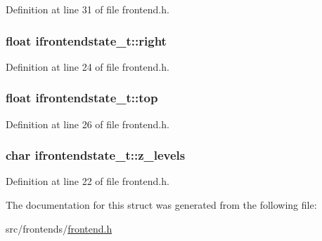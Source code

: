 Definition at line 31 of file frontend.\-h.

\hypertarget{structifrontendstate__t_a7c304035e472522fb01b3bb85b37eef8}{
\subsubsection[{right}]{\setlength{\rightskip}{0pt plus 5cm}float ifrontendstate\-\_\-t\-::right}}\label{structifrontendstate__t_a7c304035e472522fb01b3bb85b37eef8}


Definition at line 24 of file frontend.\-h.

\hypertarget{structifrontendstate__t_afda9cb91a47174c6e95a4888918964f4}{
\subsubsection[{top}]{\setlength{\rightskip}{0pt plus 5cm}float ifrontendstate\-\_\-t\-::top}}\label{structifrontendstate__t_afda9cb91a47174c6e95a4888918964f4}


Definition at line 26 of file frontend.\-h.

\hypertarget{structifrontendstate__t_aefb96a4cd8758bcd9a3e5b506290adca}{
\subsubsection[{z\-\_\-levels}]{\setlength{\rightskip}{0pt plus 5cm}char ifrontendstate\-\_\-t\-::z\-\_\-levels}}\label{structifrontendstate__t_aefb96a4cd8758bcd9a3e5b506290adca}


Definition at line 22 of file frontend.\-h.



The documentation for this struct was generated from the following file\-:\begin{DoxyCompactItemize}
\item 
src/frontends/\hyperlink{frontend_8h}{frontend.\-h}\end{DoxyCompactItemize}

